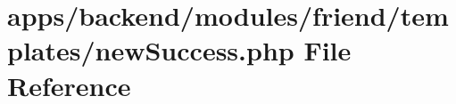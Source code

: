 \hypertarget{backend_2modules_2friend_2templates_2new_success_8php}{\section{apps/backend/modules/friend/templates/new\-Success.php File Reference}
\label{backend_2modules_2friend_2templates_2new_success_8php}
}

